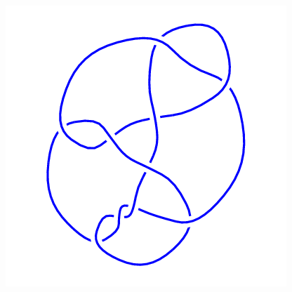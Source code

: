 \begin{figure}[H]
\begin{minipage}[b]{.18\linewidth}
	\end{minipage}
	\begin{minipage}[b]{.18\linewidth}
		\centering
		\includegraphics[width=\linewidth]{../data/10_131.png}
	\end{minipage}
\end{figure}
